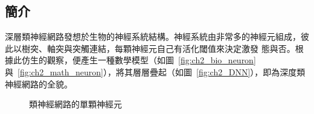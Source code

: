 \subsection{簡介}
深層類神經網路發想於生物的神經系統結構。神經系統由非常多的神經元組成，彼此以樹突、軸突與突觸連結，每顆神經元自己有活化閾值來決定激發
態與否。根據此仿生的觀察，便產生一種數學模型（如圖~\ref{fig:ch2_bio_neuron}與~\ref{fig:ch2_math_neuron}），將其層層疊起（如圖~\ref{fig:ch2_DNN}），即為深度類神經網路的全貌。
\begin{figure}[hb]
\centering
{}
\caption{類神經網路的單顆神經元}
\end{figure}


